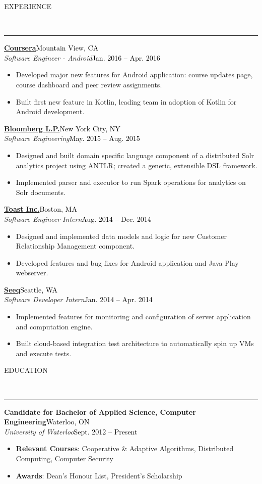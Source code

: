 \documentclass[11pt, letterpaper, oneside]{article}
\newcommand{\HRule}[2]{\textcolor{#1}{\rule{\linewidth}{#2}}}
\newcommand{\sectiontitle}[1]{\begin{minipage}{\textwidth}\vspace{-7.5pt}\begin{flushleft}\hspace{-20.5pt}\vspace{-25pt}
\Large\MakeUppercase{#1}\end{flushleft}\end{minipage}\\\HRule{black}{0.15mm}\vspace{\baselineskip}}
\newenvironment{ressection}[1]{
  \sectiontitle{#1}}
  {\vspace{-\baselineskip}}
\newcommand{\resentryheader}[4]{
    \vspace{-6pt}
    \textbf{#1}\hspace{\stretch{1}}\textcolor{black}{#3}\\
    \textit{#2}\hspace{\stretch{1}}\textcolor{black}{#4}\\
}
\newcommand{\resitem}[1]{
    \vspace{2pt}
    \item \begin{flushleft} #1 \end{flushleft}
}
\newcommand{\resskillsitem}[2]{
	\vspace{-12pt}
    \item \begin{flushleft} \textbf{#1}: #2 \end{flushleft}
    \vspace{4pt}
}
\newenvironment{resentry}[4]{
  \begin{minipage}{\textwidth}
  \vspace{-3pt}
    \resentryheader{#1}{#2}{#3}{#4}
        \vspace{-\baselineskip}
    \begin{itemize}[noitemsep,nolistsep]
}{
    \end{itemize}
        \vspace{\baselineskip}
        \end{minipage}
}
\begin{document}
\begin{ressection}{Experience}
 \begin{resentry}{\href{https://www.coursera.org/}{Coursera}}{Software Engineer - Android}{Mountain View, CA}{Jan. 2016 -- Apr. 2016}
    \resitem{Developed major new features for Android application: course updates page, course dashboard and peer review assignments.}
    \resitem{Built first new feature in Kotlin, leading team in adoption of Kotlin for Android development.}
    \vspace{-6pt}\hspace{-15pt}
  \end{resentry}  
  \begin{resentry}{\href{http://www.bloomberg.com/professional/}{Bloomberg L.P.}}{Software Engineering}{New York City, NY}{May. 2015 -- Aug. 2015}
    \resitem{Designed and built domain specific language component of a distributed Solr analytics project using ANTLR; created a generic, extensible DSL framework.}
    \resitem{Implemented parser and executor to run Spark operations for analytics on Solr documents.}
    \vspace{-6pt} \hspace{-15pt}
  \end{resentry}  
  \begin{resentry}{\href{http://pos.toasttab.com/}{Toast Inc.}}{Software Engineer Intern}{Boston, MA}{Aug. 2014 -- Dec. 2014}
   \resitem{Designed and implemented data models and logic for new Customer Relationship Management component. }
    \resitem{Developed features and bug fixes for Android application and Java Play webserver.}
    \vspace{-6pt}  \hspace{-15pt}
  \end{resentry}  
  \begin{resentry}{\href{http://www.seeq.com/}{Seeq}}{Software Developer Intern}{Seattle, WA}{Jan. 2014 -- Apr. 2014}
    \resitem{Implemented features for monitoring and configuration of server application and computation engine.}    
    \resitem{Built cloud-based integration test architecture to automatically spin up VMs and execute tests.}
    \vspace{-6pt} \hspace{-15pt}
  \end{resentry}
\end{ressection}

\vspace{-2pt}

\begin{ressection}{Education}
  \begin{resentry}{Candidate for Bachelor of Applied Science, Computer Engineering}{University of Waterloo}{Waterloo, ON}{Sept. 2012 -- Present}
  	\vspace{12pt}
	\resskillsitem{Relevant Courses}{Cooperative \& Adaptive Algorithms, Distributed Computing, Computer Security}
	\vspace{10pt}  	
  	\resskillsitem{Awards}{Dean's Honour List, President's Scholarship}{}
  \end{resentry}
\end{ressection}
\end{document}
